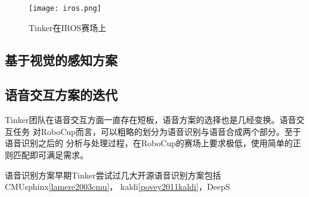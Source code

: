 \begin{figure}
  \centering
  \texttt{[image: iros.png]}
  \caption{Tinker在IROS赛场上}
  \label{fig:iros}
\end{figure}


\subsection{基于视觉的感知方案}

\subsection{语音交互方案的迭代}

Tinker团队在语音交互方面一直存在短板，语音方案的选择也是几经变换。语音交互任务
对RoboCup而言，可以粗略的划分为语音识别与语音合成两个部分。至于语音识别之后的
分析与处理过程，在RoboCup的赛场上要求极低，使用简单的正则匹配即可满足需求。

语音识别方案早期Tinker尝试过几大开源语音识别方案包括CMUsphinx\ref{lamere2003cmu}，
kaldi\ref{povey2011kaldi}，DeepS




























